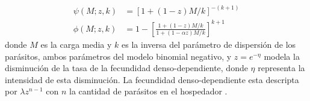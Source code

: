 \documentclass[12pt,a4paper]{article}
\theoremstyle{plain}%
\theoremstyle{definition}
\theoremstyle{remark}
\begin{document}
\begin{itemize}
		\begin{equation}
		\begin{split}
		\psi(M;z,k)&=\left[ 1+(1-z)M/k\right] ^{-(k+1)}\\
		\phi(M;z,k)&=1-\left[ \frac{1+(1-z)M/k}{1+(1-\alpha z)M/k}\right] ^{k+1}
		\end{split}
		\end{equation} 
		donde $M$ es la carga media y $k$ es la inversa del parámetro de dispersión de los parásitos, ambos parámetros del modelo binomial negativo, y $z = e^{-\eta}$ 
		modela la disminución de la tasa de la fecundidad denso-dependiente, donde $\eta$ representa la intensidad de esta disminución.
		La fecundidad denso-dependiente
		esta descripta por $\lambda z^{n-1}$ con $n$ la cantidad de parásitos en el
		hospedador \cite{hall2000geographical}.
		
	\end{itemize}
\end{document}
